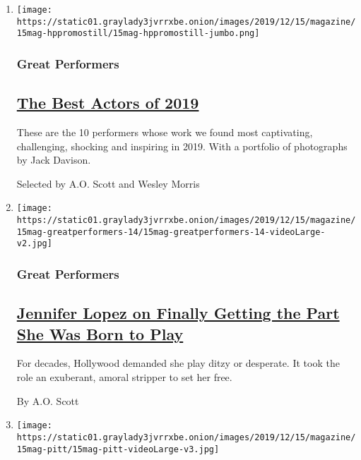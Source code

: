 \begin{enumerate}
\def\labelenumi{\arabic{enumi}.}
\item
  \texttt{[image: https://static01.graylady3jvrrxbe.onion/images/2019/12/15/magazine/15mag-hppromostill/15mag-hppromostill-jumbo.png]}

  \hypertarget{great-performers}{%
  \subsubsection{Great Performers}\label{great-performers}}

  \hypertarget{the-best-actors-of-2019}{%
  \subsection{\texorpdfstring{\href{/interactive/2019/12/09/magazine/best-actors.html}{The
  Best Actors of
  2019}}{The Best Actors of 2019}}\label{the-best-actors-of-2019}}

  These are the 10 performers whose work we found most captivating,
  challenging, shocking and inspiring in 2019. With a portfolio of
  photographs by Jack Davison.

  Selected by A.O. Scott and Wesley Morris
\item
  \texttt{[image: https://static01.graylady3jvrrxbe.onion/images/2019/12/15/magazine/15mag-greatperformers-14/15mag-greatperformers-14-videoLarge-v2.jpg]}

  \hypertarget{great-performers-1}{%
  \subsubsection{Great Performers}\label{great-performers-1}}

  \hypertarget{jennifer-lopez-on-finally-getting-the-part-she-was-born-to-play}{%
  \subsection{\texorpdfstring{\href{/interactive/2019/12/09/magazine/jennifer-lopez-hustlers.html}{Jennifer
  Lopez on Finally Getting the Part She Was Born to
  Play}}{Jennifer Lopez on Finally Getting the Part She Was Born to Play}}\label{jennifer-lopez-on-finally-getting-the-part-she-was-born-to-play}}

  For decades, Hollywood demanded she play ditzy or desperate. It took
  the role an exuberant, amoral stripper to set her free.

  By A.O. Scott
\item
  \texttt{[image: https://static01.graylady3jvrrxbe.onion/images/2019/12/15/magazine/15mag-pitt/15mag-pitt-videoLarge-v3.jpg]}


\end{enumerate}

